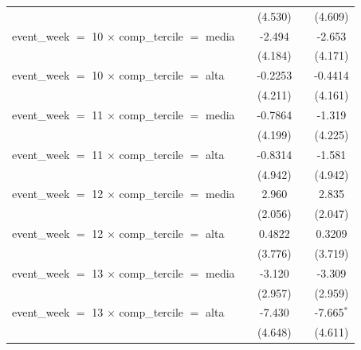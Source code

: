 \begin{tabular}{lcccc}
                                                           &                & (4.530)       &              & (4.609)\\   
   event\_week $=$ 10 $\times$ comp\_tercile $=$ media     &                & -2.494        &              & -2.653\\   
                                                           &                & (4.184)       &              & (4.171)\\   
   event\_week $=$ 10 $\times$ comp\_tercile $=$ alta      &                & -0.2253       &              & -0.4414\\   
                                                           &                & (4.211)       &              & (4.161)\\   
   event\_week $=$ 11 $\times$ comp\_tercile $=$ media     &                & -0.7864       &              & -1.319\\   
                                                           &                & (4.199)       &              & (4.225)\\   
   event\_week $=$ 11 $\times$ comp\_tercile $=$ alta      &                & -0.8314       &              & -1.581\\   
                                                           &                & (4.942)       &              & (4.942)\\   
   event\_week $=$ 12 $\times$ comp\_tercile $=$ media     &                & 2.960         &              & 2.835\\   
                                                           &                & (2.056)       &              & (2.047)\\   
   event\_week $=$ 12 $\times$ comp\_tercile $=$ alta      &                & 0.4822        &              & 0.3209\\   
                                                           &                & (3.776)       &              & (3.719)\\   
   event\_week $=$ 13 $\times$ comp\_tercile $=$ media     &                & -3.120        &              & -3.309\\   
                                                           &                & (2.957)       &              & (2.959)\\   
   event\_week $=$ 13 $\times$ comp\_tercile $=$ alta      &                & -7.430        &              & -7.665$^{*}$\\   
                                                           &                & (4.648)       &              & (4.611)\\   

\end{tabular}
